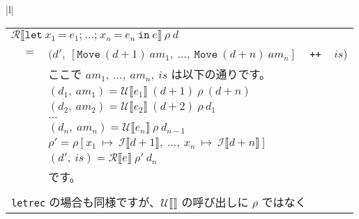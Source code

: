 \documentclass{jarticle}
\begin{document}
\begin{tabular} {|l|} \hline
	\begin{tabular}{r c l}
		\multicolumn{3}{l}{$\mathcal{R} \llbracket \texttt{let} ~ x_1 ~ \texttt{=} ~ e_1\texttt{;} ~  \ldots \texttt{;} ~ x_n ~ \texttt{=} ~ e_n ~ \texttt{in} ~ e \rrbracket ~ \rho ~ d$} \\
		 & $=$ & $(d', ~ \left[ \texttt{Move} ~ (d + 1) ~ am_1, ~ \ldots, ~ \texttt{Move} ~ (d + n) ~ am_n \right]$ ~ \texttt{++} ~ $is$)                                                  \\
		 &     & ここで $am_1, ~ \ldots, ~ am_n, ~ is$ は以下の通りです。                                                                                                                  \\
		 &     & $(d_1, ~ am_1) = \mathcal{U} \llbracket e_1 \rrbracket ~ (d + 1) ~ \rho ~ (d + n)$                                                                                        \\
		 &     & $(d_2, ~ am_2) = \mathcal{U} \llbracket e_2 \rrbracket ~ (d + 2) ~ \rho ~ d_1$                                                                                            \\
		 &     & $\ldots$                                                                                                                                                                  \\
		 &     & $(d_n, ~ am_n) = \mathcal{U} \llbracket e_n \rrbracket ~ \rho ~ d_{n - 1}$                                                                                                \\
		 &     & $\rho' = \rho \left[x_1 ~ \mapsto ~ \mathcal{I} \llbracket d + 1 \rrbracket, ~ \ldots , ~ x_n ~ \mapsto ~ \mathcal{I} \llbracket d + n \rrbracket \right]$                \\
		 &     & $(d', ~ is) = \mathcal{R} \llbracket e \rrbracket ~ \rho' ~ d_n$                                                                                                          \\
		 &     & です。                                                                                                                                                                    \\
		\\
		\multicolumn{3}{l}{\texttt{letrec} の場合も同様ですが、$\mathcal{U} \llbracket \rrbracket$ の呼び出しに $\rho$ ではなく}                                                           \\

\end{tabular}
\end{tabular}
\end{document}
